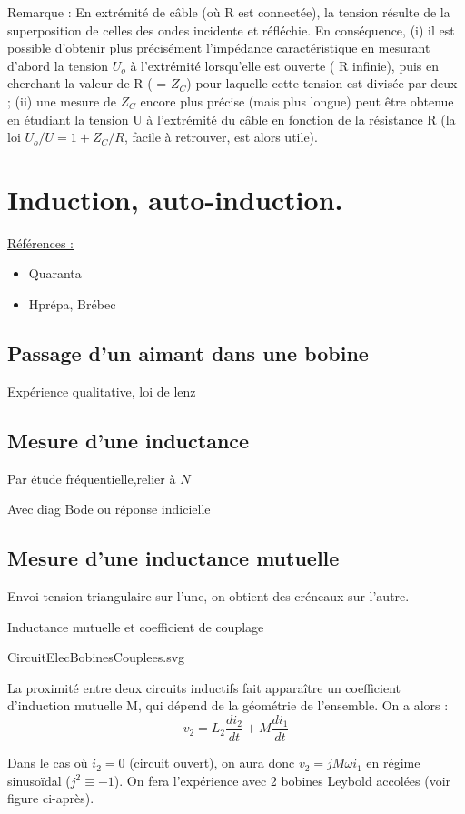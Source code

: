 \documentclass{article}%
\begin{document}
Remarque : En extrémité de câble (où R est connectée), la tension résulte de la superposition de celles des ondes incidente et réfléchie. En conséquence, (i) il est possible d'obtenir plus précisément l'impédance caractéristique en mesurant d'abord la tension $U_{o}$ à l'extrémité lorsqu'elle est ouverte ( R infinie), puis en cherchant la valeur de R ( = $Z_{C}$) pour laquelle cette tension est divisée par deux ; (ii) une mesure de $Z_{C}$ encore plus précise (mais plus longue) peut être obtenue en étudiant la tension U à l'extrémité du câble en fonction de la résistance R (la loi $U_{o}/U = 1 + Z_{C}/R$, facile à retrouver, est alors utile). 

\section{Induction, auto-induction.}

\underline{Références :}
\begin{itemize}
	\item Quaranta
	\item Hprépa, Brébec
\end{itemize}

\subsection{Passage d'un aimant dans une bobine}
Expérience qualitative, loi de lenz
\subsection{Mesure d'une inductance}
Par étude fréquentielle,relier à $N$

Avec diag Bode ou réponse indicielle
\subsection{Mesure d'une inductance mutuelle}
Envoi tension triangulaire sur l'une, on obtient des créneaux sur l'autre.

Inductance mutuelle et coefficient de couplage

CircuitElecBobinesCouplees.svg

La proximité entre deux circuits inductifs fait apparaître un coefficient d'induction mutuelle M, qui dépend de la géométrie de l'ensemble. On a alors :
\[ v_2 = L_2 \frac{di_2 }{dt} + M\frac{di_1 }{dt}\]

Dans le cas où $i_{2}=0$ (circuit ouvert), on aura donc $v_{2} = j M \omega i_{1}$ en régime sinusoïdal ($ j^2\equiv -1$). On fera l'expérience avec 2 bobines Leybold accolées (voir figure ci-après).
\end{document}
